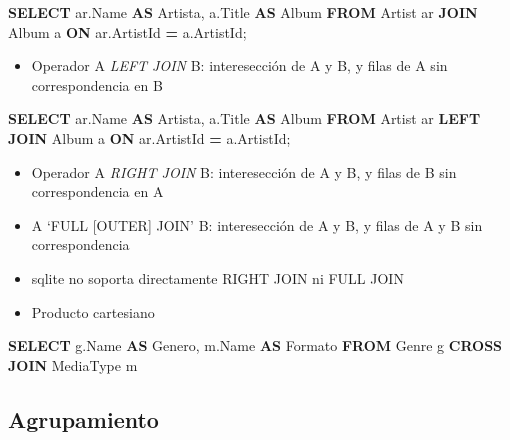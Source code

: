 \documentclass[
]{book}
\newenvironment{Shaded}{\begin{snugshade}}{\end{snugshade}}
\newcommand{\KeywordTok}[1]{\textcolor[rgb]{0.13,0.29,0.53}{\textbf{#1}}}
\newcommand{\NormalTok}[1]{#1}
\newcommand{\OperatorTok}[1]{\textcolor[rgb]{0.81,0.36,0.00}{\textbf{#1}}}
\providecommand{\tightlist}{%
  \setlength{\itemsep}{0pt}\setlength{\parskip}{0pt}}
\theoremstyle{break}
\theoremstyle{nonumberplain}
\begin{document}
\begin{Shaded}
\begin{Highlighting}[]
  \KeywordTok{SELECT}\NormalTok{ ar.Name }\KeywordTok{AS}\NormalTok{ Artista, a.Title }\KeywordTok{AS}\NormalTok{ Album}
  \KeywordTok{FROM}\NormalTok{ Artist ar }\KeywordTok{JOIN}\NormalTok{ Album a }\KeywordTok{ON}\NormalTok{ ar.ArtistId }\OperatorTok{=}\NormalTok{ a.ArtistId;}
\end{Highlighting}
\end{Shaded}

\begin{itemize}
\tightlist
\item
  Operador A \emph{LEFT JOIN} B: interesección de A y B, y filas de A sin correspondencia en B
\end{itemize}

\begin{Shaded}
\begin{Highlighting}[]
  \KeywordTok{SELECT}\NormalTok{ ar.Name }\KeywordTok{AS}\NormalTok{ Artista, a.Title }\KeywordTok{AS}\NormalTok{ Album}
  \KeywordTok{FROM}\NormalTok{ Artist ar }\KeywordTok{LEFT} \KeywordTok{JOIN}\NormalTok{ Album a }\KeywordTok{ON}\NormalTok{ ar.ArtistId }\OperatorTok{=}\NormalTok{ a.ArtistId;}
\end{Highlighting}
\end{Shaded}

\begin{itemize}
\item
  Operador A \emph{RIGHT JOIN} B: interesección de A y B, y filas de B sin correspondencia en A
\item
  A `FULL {[}OUTER{]} JOIN' B: interesección de A y B, y filas de A y B sin correspondencia
\item
  sqlite no soporta directamente RIGHT JOIN ni FULL JOIN
\item
  Producto cartesiano
\end{itemize}

\begin{Shaded}
\begin{Highlighting}[]
  \KeywordTok{SELECT}\NormalTok{ g.Name }\KeywordTok{AS}\NormalTok{ Genero, m.Name }\KeywordTok{AS}\NormalTok{ Formato}
  \KeywordTok{FROM}\NormalTok{ Genre g }\KeywordTok{CROSS} \KeywordTok{JOIN}\NormalTok{ MediaType m}
\end{Highlighting}
\end{Shaded}

\subsection{Agrupamiento}\label{agrupamiento}
\end{document}
